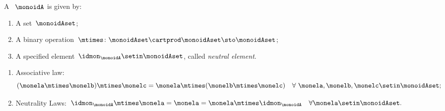 \begin{ctdefinition}[Monoid]
    \label{def:monoid}
    A ~$\monoidA$ is given by:
    \begin{body}
        \constit
        \begin{enumerate}
            \item A set~$\monoidAset$;
            \item A binary operation~$\mtimes \colon \monoidAset \cartprod \monoidAset \sto \monoidAset$;
            \item A specified element~$\idmon_\monoidA \setin \monoidAset$, called \emph{neutral element}.
        \end{enumerate}
        \condit
        \begin{enumerate}
            \item Associative law:
                  \begin{equation} \label{eq:monoid-associative-law}
                      (\monela\mtimes  \monelb)\mtimes  \monelc=
                      \monela\mtimes  (\monelb\mtimes  \monelc) \quad  \forall \  \monela, \monelb, \monelc \setin \monoidAset;
                  \end{equation}
            \item Neutrality Laws:~$\idmon_\monoidA \mtimes \monela=\monela=\monela \mtimes  \idmon_\monoidA \quad  \forall \monela \setin \monoidAset.$
        \end{enumerate}
    \end{body}
\end{ctdefinition}

